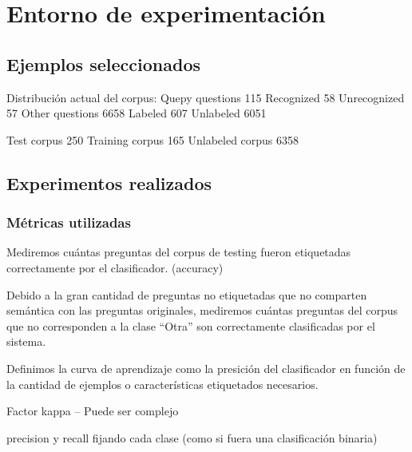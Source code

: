 \section{Entorno de experimentación}

\subsection{Ejemplos seleccionados}

Distribución actual del corpus:
Quepy questions 115
	Recognized 58
	Unrecognized 57
Other questions 6658
	Labeled 607
	Unlabeled 6051

Test corpus 250
Training corpus 165
Unlabeled corpus 6358

\subsection{Experimentos realizados}



\subsubsection{Métricas utilizadas}
\begin{description}
    \item[Precisión] Mediremos cuántas preguntas del corpus de testing fueron etiquetadas correctamente por el clasificador. (accuracy)
    \item[Precisión en preguntas reconocidas] Debido a la gran cantidad de preguntas no etiquetadas que no comparten semántica con las preguntas originales, mediremos cuántas preguntas del corpus que no corresponden a la clase ``Otra'' son correctamente clasificadas por el sistema.
    \item[Curva de aprendizaje] Definimos la curva de aprendizaje como la presición del clasificador en función de la cantidad de ejemplos o características etiquetados necesarios.
    \item Factor kappa  -- Puede ser complejo
    \item precision y recall fijando cada clase (como si fuera una clasificación binaria)
\end{description}

